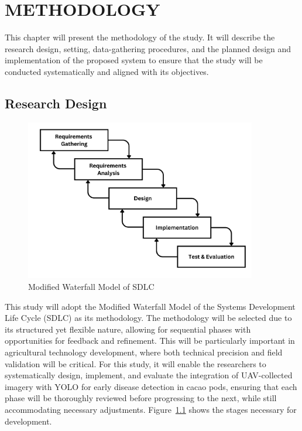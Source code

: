 \chapter{METHODOLOGY}

This chapter will present the methodology of the study. It will describe the research design, setting, data-gathering procedures, and the planned design and implementation of the proposed system to ensure that the study will be conducted systematically and aligned with its objectives.

\section{Research Design}
\begin{figure}[H]
	\centering
	\caption{Modified Waterfall Model of SDLC}
	\label{fig:waterfall}
	\includegraphics[width=0.9\textwidth]{figures/Waterfall.pdf}
\end{figure}

This study will adopt the Modified Waterfall Model of the Systems Development Life Cycle (SDLC) as its methodology. The methodology will be selected due to its structured yet flexible nature, allowing for sequential phases with opportunities for feedback and refinement. This will be particularly important in agricultural technology development, where both technical precision and field validation will be critical. For this study, it will enable the researchers to systematically design, implement, and evaluate the integration of UAV-collected imagery with YOLO for early disease detection in cacao pods, ensuring that each phase will be thoroughly reviewed before progressing to the next, while still accommodating necessary adjustments. Figure~\ref{fig:waterfall} shows the stages necessary for development.

